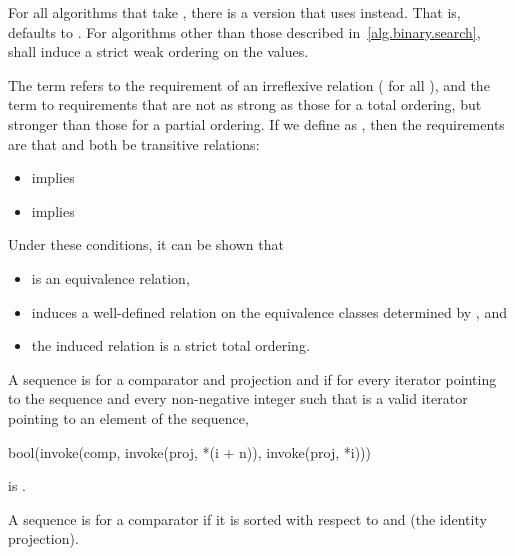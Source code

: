 \pnum
For all algorithms that take ,
there is a version that uses  instead.
That is,  defaults to .
For algorithms other than those described in~\ref{alg.binary.search},
 shall induce a strict weak ordering on the values.

\pnum
The term  refers to the requirement
of an irreflexive relation ( for all ),
and the term  to requirements
that are not as strong as those for a total ordering,
but stronger than those for a partial ordering.
If we define  as ,
then the requirements are that  and 
both be transitive relations:
\begin{itemize}
\item {} implies 
\item {} implies 
\end{itemize}
\begin{note}
Under these conditions, it can be shown that
\begin{itemize}
\item
   is an equivalence relation,
\item
   induces a well-defined relation
  on the equivalence classes determined by , and
\item
  the induced relation is a strict total ordering.
\end{itemize}
\end{note}

\pnum
{}%
A sequence is 
for a comparator and projection  and 
if for every iterator  pointing to the sequence and
every non-negative integer 
such that  is a valid iterator
pointing to an element of the sequence,
\begin{codeblock}
bool(invoke(comp, invoke(proj, *(i + n)), invoke(proj, *i)))
\end{codeblock}
is .

\pnum
{}%
A sequence is 
for a comparator 
if it is sorted with respect to
 and  (the identity projection).

